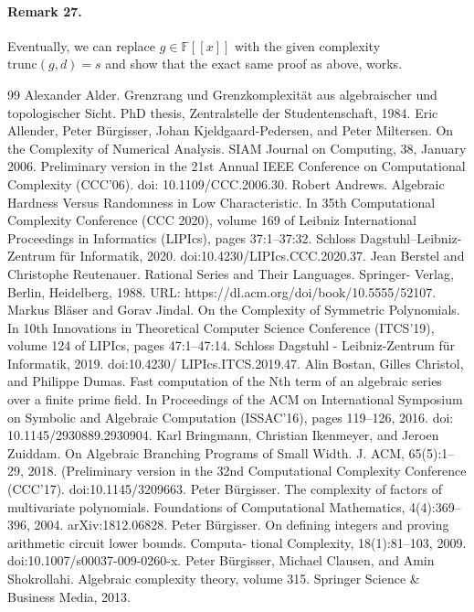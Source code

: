 \documentclass[10pt,a4paper]{article}
\begin{document}
\paragraph{Remark 27.} Eventually, we can replace $g\in\mathbb F[[x]]$ with the given complexity $\mathrm{trunc}(g,d)=s$ and show that the exact same proof as above, works.

\begin{thebibliography}{99}
 Alexander Alder. Grenzrang und Grenzkomplexität aus algebraischer und topologischer Sicht. PhD thesis, Zentralstelle der Studentenschaft, 1984.
 Eric Allender, Peter Bürgisser, Johan Kjeldgaard-Pedersen, and Peter Miltersen. On the Complexity of Numerical Analysis. SIAM Journal on Computing, 38, January 2006. Preliminary version in the 21st Annual IEEE Conference on Computational Complexity (CCC’06). doi: 10.1109/CCC.2006.30.
 Robert Andrews. Algebraic Hardness Versus Randomness in Low Characteristic. In 35th Computational Complexity Conference (CCC 2020), volume 169 of Leibniz International Proceedings in Informatics (LIPIcs), pages 37:1–37:32. Schloss Dagstuhl–Leibniz-Zentrum für Informatik, 2020. doi:10.4230/LIPIcs.CCC.2020.37.
 Jean Berstel and Christophe Reutenauer. Rational Series and Their Languages. Springer- Verlag, Berlin, Heidelberg, 1988. URL: https://dl.acm.org/doi/book/10.5555/52107.
 Markus Bläser and Gorav Jindal. On the Complexity of Symmetric Polynomials. In 10th Innovations in Theoretical Computer Science Conference (ITCS’19), volume 124 of LIPIcs, pages 47:1–47:14. Schloss Dagstuhl - Leibniz-Zentrum für Informatik, 2019. doi:10.4230/ LIPIcs.ITCS.2019.47.
 Alin Bostan, Gilles Christol, and Philippe Dumas. Fast computation of the Nth term of an algebraic series over a finite prime field. In Proceedings of the ACM on International Symposium on Symbolic and Algebraic Computation (ISSAC’16), pages 119–126, 2016. doi: 10.1145/2930889.2930904.
 Karl Bringmann, Christian Ikenmeyer, and Jeroen Zuiddam. On Algebraic Branching Programs of Small Width. J. ACM, 65(5):1–29, 2018. (Preliminary version in the 32nd Computational Complexity Conference (CCC’17). doi:10.1145/3209663.
 Peter Bürgisser. The complexity of factors of multivariate polynomials. Foundations of Computational Mathematics, 4(4):369–396, 2004. arXiv:1812.06828.
 Peter Bürgisser. On defining integers and proving arithmetic circuit lower bounds. Computa- tional Complexity, 18(1):81–103, 2009. doi:10.1007/s00037-009-0260-x.
 Peter Bürgisser, Michael Clausen, and Amin Shokrollahi. Algebraic complexity theory, volume 315. Springer Science \& Business Media, 2013.

\end{thebibliography}
\end{document}
